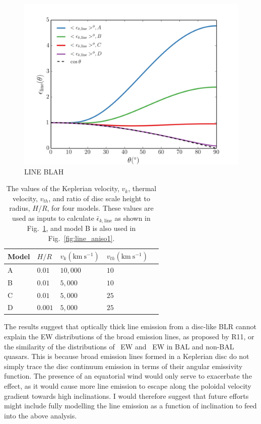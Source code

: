 \begin{figure}
\centering
\includegraphics[width=1.0\textwidth]{figures/ewpaper/line_emiss.png}
\caption
{
LINE BLAH
}
\label{fig:line_aniso2}
\end{figure}

\begin{table}
\centering
\begin{tabular}{p{1cm}p{2cm}p{2cm}p{2cm}p{2cm}}
\hline
Model & $H/R$ & $v_k (\mathrm{km~s^{-1}})$ & $v_{th} (\mathrm{km~s^{-1}})$ \\
\hline \hline 
A & $0.01$ & $10,000$ & $10$ \\
B & $0.01$ & $5,000$ & $10$ \\
C & $0.01$ & $5,000$ & $25$ \\
D & $0.001$ & $5,000$ & $25$ \\
\hline 
\end{tabular}
\caption{
The values of the Keplerian velocity, $v_k$, thermal velocity, $v_{th}$,
and ratio of disc scale height to radius, $H/R$, for four models. These values
are used as inputs to calculate $\bar{\epsilon}_{k,\mathrm{line}}$ as shown in 
Fig.~\ref{fig:line_aniso2}, and model B is also used in 
Fig.~\ref{fig:line_aniso1}.
}
\label{tab:line_mods}
\end{table}

The results suggest that optically thick line emission from a
disc-like BLR cannot explain the EW distributions of the broad emission lines,
as proposed by R11, or the similarity of the distributions of \civline\ EW and \mgline\ EW in BAL and non-BAL
quasars. This is because broad emission lines formed in a Keplerian disc do not simply trace 
the disc continuum emission in terms of their angular emissivity function.
The presence of an equatorial wind would only serve to exacerbate the effect,
as it would cause more line emission to escape along the poloidal velocity gradient towards high 
inclinations. I would therefore suggest that future efforts might include fully modelling 
the line emission as a function of inclination to feed into the above analysis.

